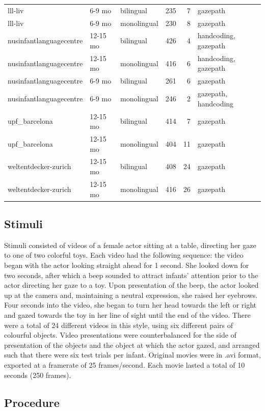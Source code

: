 \documentclass[,man,floatsintext]{apa6}
\begin{document}
\begin{longtable}[t]{lllrrl}
lll-liv & 6-9 mo & bilingual & 235 & 7 & gazepath\\
lll-liv & 6-9 mo & monolingual & 230 & 8 & gazepath\\
nusinfantlanguagecentre & 12-15 mo & bilingual & 426 & 4 & handcoding, gazepath\\
\addlinespace
nusinfantlanguagecentre & 12-15 mo & monolingual & 416 & 6 & handcoding, gazepath\\
nusinfantlanguagecentre & 6-9 mo & bilingual & 261 & 6 & gazepath\\
nusinfantlanguagecentre & 6-9 mo & monolingual & 246 & 2 & gazepath, handcoding\\
upf\_barcelona & 12-15 mo & bilingual & 414 & 7 & gazepath\\
upf\_barcelona & 12-15 mo & monolingual & 404 & 11 & gazepath\\
\addlinespace
weltentdecker-zurich & 12-15 mo & bilingual & 408 & 24 & gazepath\\
weltentdecker-zurich & 12-15 mo & monolingual & 416 & 26 & gazepath\\
\bottomrule
\end{longtable}

\hypertarget{stimuli}{%
\subsection{Stimuli}\label{stimuli}}

Stimuli consisted of videos of a female actor sitting at a table, directing her gaze to one of two colorful toys. Each video had the following sequence: the video began with the actor looking straight ahead for 1 second. She looked down for two seconds, after which a beep sounded to attract infants' attention prior to the actor directing her gaze to a toy. Upon presentation of the beep, the actor looked up at the camera and, maintaining a neutral expression, she raised her eyebrows. Four seconds into the video, she began to turn her head towards the left or right and gazed towards the toy in her line of sight until the end of the video. There were a total of 24 different videos in this style, using six different pairs of colourful objects. Video presentations were counterbalanced for the side of presentation of the objects and the object at which the actor gazed, and arranged such that there were six test trials per infant. Original movies were in .avi format, exported at a framerate of 25 frames/second. Each movie lasted a total of 10 seconds (250 frames).

\hypertarget{procedure}{%
\subsection{Procedure}\label{procedure}}
\end{document}
